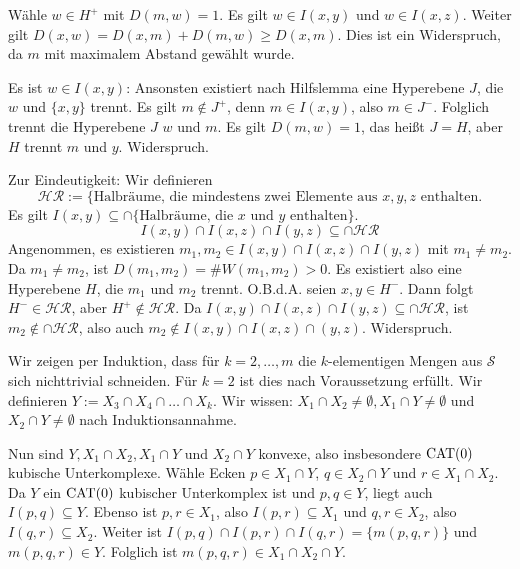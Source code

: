 \begin{beweis}
\begin{enumerate}[(i)]
		Wähle $w \in H^+$ mit $D(m,w) = 1$.
		Es gilt $w \in I(x,y)$ und $w \in I(x,z)$.
		Weiter gilt $D(x,w) = D(x,m) + D(m,w) \geq D(x,m)$.
		Dies ist ein Widerspruch, da $m$ mit maximalem Abstand gewählt wurde.
		
		Es ist $w \in I(x,y)$:
		Ansonsten existiert nach Hilfslemma eine Hyperebene $J$, die $w$ und $\{x,y\}$ trennt. 
		Es gilt $m \notin J^+$, denn $m \in I(x,y)$, also $m \in J^-$.
		Folglich trennt die Hyperebene $J$ $w$ und $m$.
		Es gilt $D(m,w) = 1$, das heißt $J = H$, aber $H$ trennt $m$ und $y$. Widerspruch.
		
		Zur Eindeutigkeit:
		Wir definieren
		\[
			\mathcal{HR} := \{\text{Halbräume, die mindestens zwei Elemente aus } x,y,z \text{ enthalten}.
		\]
		Es gilt $I(x,y) \subseteq \cap \{\text{Halbräume, die } x \text{ und } y \text{ enthalten}\}$.
		\[
			I(x,y) \cap I(x,z) \cap I(y,z) \subseteq \cap \mathcal{HR}
		\]
		Angenommen, es existieren $m_1,m_2 \in I(x,y) \cap I(x,z) \cap I(y,z)$ mit $m_1 \neq m_2$.
		Da $m_1 \neq m_2$, ist $D(m_1,m_2) = \#W(m_1,m_2) > 0$.
		Es existiert also eine Hyperebene $H$, die $m_1$ und $m_2$ trennt.
		O.B.d.A. seien $x,y \in H^-$.
		Dann folgt $H^- \in \mathcal{HR}$, aber $H^+ \notin \mathcal{HR}$.
		Da $I(x,y) \cap I(x,z) \cap I(y,z) \subseteq \cap \mathcal{HR}$, ist $m_2 \notin \cap \mathcal{HR}$, also auch $m_2 \notin I(x,y) \cap I(x,z) \cap(y,z)$.
		Widerspruch. \qedhere
	\end{enumerate}
\end{beweis}

\begin{beweis}
	Wir zeigen per Induktion, dass für $k = 2, \dots, m$ die $k$-elementigen Mengen aus $\mathcal{S}$ sich nichttrivial schneiden.
	Für $k=2$ ist dies nach Voraussetzung erfüllt.
	Wir definieren $Y := X_3 \cap X_4 \cap \dots \cap X_k$.
	Wir wissen: $X_1 \cap  X_2 \neq \emptyset, X_1 \cap Y \neq \emptyset$ und $X_2 \cap Y \neq \emptyset$ nach Induktionsannahme.
	
	Nun sind $Y, X_1 \cap X_2, X_1 \cap Y$ und $X_2 \cap Y$ konvexe, also insbesondere $\operatorname{CAT(0)}$ kubische Unterkomplexe.
	Wähle Ecken $p \in X_1 \cap Y$, $q \in X_2 \cap Y$ und $r \in X_1 \cap X_2$.
	Da $Y$ ein $\operatorname{CAT(0)}$ kubischer Unterkomplex ist und $p,q \in Y$, liegt auch $I(p,q) \subseteq Y$.
	Ebenso ist $p,r \in X_1$, also $I(p,r) \subseteq X_1$ und $q,r \in X_2$, also $I(q,r) \subseteq X_2$.
	Weiter ist $I(p,q) \cap I(p,r) \cap I(q,r) = \{m(p,q,r)\}$ und $m(p,q,r) \in Y$.
	Folglich ist $m(p,q,r) \in X_1 \cap X_2 \cap Y$. \qedhere
\end{beweis}